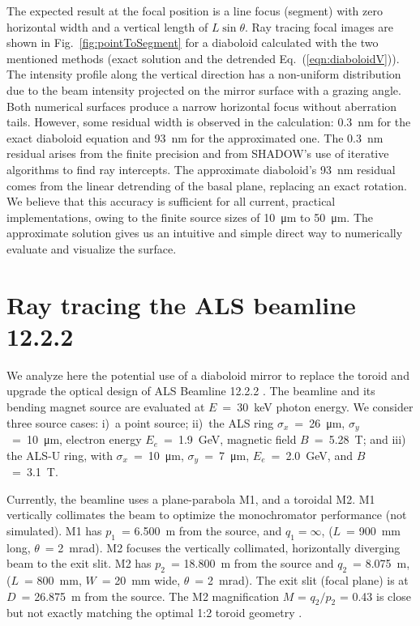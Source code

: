 \documentclass{iucr}       %
\begin{document}
The expected result at the focal position is a line focus (segment) with zero horizontal width and a vertical length of $L\sin\theta$. Ray tracing focal images are shown in Fig.~\ref{fig:pointToSegment} for a diaboloid calculated with the two mentioned methods (exact solution and the detrended Eq.~(\ref{eqn:diaboloidV})). The intensity profile along the vertical direction has a non-uniform distribution due to the beam intensity projected on the mirror surface with a grazing angle. Both numerical surfaces produce a narrow horizontal focus without aberration tails. However, some residual width is observed in the calculation: \SI{0.3}{\nano\meter} for the exact diaboloid equation and \SI{93}{\nano\meter} for the approximated one. The \SI{0.3}{\nano\meter} residual arises from the finite precision and from SHADOW's use of iterative algorithms to find ray intercepts.
The approximate diaboloid's \SI{93}{\nano\meter} residual comes from the linear detrending of the basal plane, replacing an exact rotation. We believe that this accuracy is sufficient for all current, practical implementations, owing to the finite source sizes of \SI{10}{\micro\meter} to \SI{50}{\micro\meter}. The approximate solution gives us an intuitive and simple direct way to numerically evaluate and visualize the surface.

\section{Ray tracing the ALS beamline 12.2.2}
\label{sec:beamline}

We analyze here the potential use of a diaboloid mirror to replace the toroid and upgrade the optical design of ALS Beamline 12.2.2 \cite{bl1222,MacDowell2004}. The beamline and its bending magnet source are evaluated at $E$~=~\SI{30}{\kilo\electronvolt} photon energy. We consider three source cases: i)~a point source; ii)~the ALS ring
$\sigma_x$~=~\SI{26}{\micro\meter}, $\sigma_y$~=~\SI{10}{\micro\meter}, 
electron energy $E_e$~=~\SI{1.9}{\giga\electronvolt}, magnetic field $B$~=~\SI{5.28}{\tesla}; and iii) the ALS-U ring, with $\sigma_x$~=~\SI{10}{\micro\meter}, $\sigma_y$~=~\SI{7}{\micro\meter}, $E_e$~=~\SI{2.0}{\giga\electronvolt}, and $B$~=~\SI{3.1}{\tesla}. 

Currently, the beamline uses a plane-parabola M1, and a toroidal M2. M1 vertically collimates the beam to optimize the monochromator performance (not simulated). M1 has $p_1$~= \SI{6.500}{\meter} from the source, and $q_1=\infty$, ($L$~= \SI{900}{\milli\meter} long, $\theta$~= \SI{2}{\milli\radian}). M2 focuses the vertically collimated, horizontally diverging beam to the exit slit. M2 has $p_2$~= \SI{18.800}{\meter} from the source and $q_2$~= \SI{8.075}{\meter}, ($L$~= \SI{800}{\milli\meter}, $W$~= \SI{20}{\milli\meter} wide, $\theta$~= \SI{2}{\milli\radian}). The exit slit (focal plane) is at $D$~= \SI{26.875}{\meter} from the source. The M2 magnification $M$ = $q_2/p_2$ = 0.43 is close but not exactly matching the optimal 1:2 toroid geometry \cite{MacDowell2004}.
\end{document}
